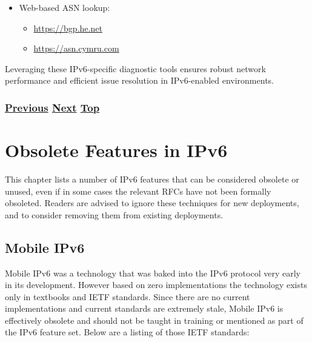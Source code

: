 \documentclass[
]{article}
\providecommand{\tightlist}{%
  \setlength{\itemsep}{0pt}\setlength{\parskip}{0pt}}
\begin{document}
\begin{itemize}
\tightlist
\item
  Web-based ASN lookup:

  \begin{itemize}
  \tightlist
  \item
    \href{https://bgp.he.net}{\url{https://bgp.he.net}}
  \item
    \href{https://asn.cymru.com}{\url{https://asn.cymru.com}}
  \end{itemize}
\end{itemize}

Leveraging these IPv6-specific diagnostic tools ensures robust network
performance and efficient issue resolution in IPv6-enabled environments.

\subsubsection{\texorpdfstring{\hyperref[advanced-troubleshooting]{Previous}
\hyperref[obsolete-features-in-ipv6]{Next}
\hyperref[troubleshooting]{Top}}{Previous Next Top}}\label{previous-next-top-39}

\pagebreak

\section{Obsolete Features in IPv6}\label{obsolete-features-in-ipv6}

This chapter lists a number of IPv6 features that can be considered
obsolete or unused, even if in some cases the relevant RFCs have not
been formally obsoleted. Readers are advised to ignore these techniques
for new deployments, and to consider removing them from existing
deployments.

\subsection{Mobile IPv6}\label{mobile-ipv6}

Mobile IPv6 was a technology that was baked into the IPv6 protocol very
early in its development. However based on zero implementations the
technology exists only in textbooks and IETF standards. Since there are
no current implementations and current standards are extremely stale,
Mobile IPv6 is effectively obsolete and should not be taught in training
or mentioned as part of the IPv6 feature set. Below are a listing of
those IETF standards:
\end{document}
